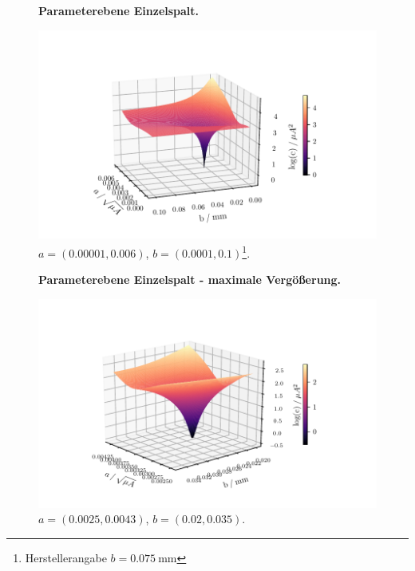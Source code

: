 \centering
\begin{figure}
    \centering
    \textbf{Parameterebene Einzelspalt.}\par\medskip
    \includegraphics[width=.9\textwidth]{python/leastSquares3.pdf}
    \caption{$a = (0.00001, 0.006)$, $b = (0.0001, 0.1)$\footnote{Herstellerangabe $b=\SI{0.075}{\milli\meter}$}.}
    \label{fig:ls3}
\end{figure}

\begin{figure}
    \centering
    \textbf{Parameterebene Einzelspalt - maximale Vergößerung.}\par\medskip
    \includegraphics[width=.9\textwidth]{python/leastSquares5.pdf}
    \caption{$a = (0.0025, 0.0043)$, $b = (0.02, 0.035)$.}
    \label{fig:ls4}
\end{figure}


